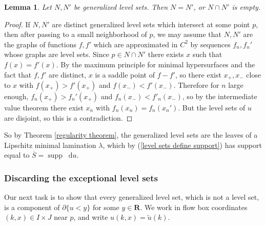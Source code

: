 \documentclass[reqno,11pt]{amsart}
\newcommand{\RR}{\mathbf{R}}
\newcommand*\dif{\mathop{}\!\mathrm{d}}
\DeclareMathOperator{\supp}{supp}
\newtheorem{lemma}[theorem]{Lemma}
\theoremstyle{definition}
\numberwithin{equation}{section}
\begin{document}


\begin{lemma}
Let $N, N'$ be generalized level sets.
Then $N = N'$, or $N \cap N'$ is empty.
\end{lemma}
\begin{proof}
If $N, N'$ are distinct generalized level sets which intersect at some point $p$, then after passing to a small neighborhood of $p$, we may assume that $N, N'$ are the graphs of functions $f, f'$ which are approximated in $C^2$ by sequences $f_n, f_n'$ whose graphs are level sets.
Since $p \in N \cap N'$ there exists $x$ such that $f(x) = f'(x)$.
By the maximum principle for minimal hypersurfaces and the fact that $f, f'$ are distinct, $x$ is a saddle point of $f - f'$, so there exist $x_+, x_-$ close to $x$ with $f(x_+) > f'(x_+)$ and $f(x_-) < f'(x_-)$.
Therefore for $n$ large enough, $f_n(x_+) > f_n'(x_+)$ and $f_n(x_-) < f'_n(x_-)$, so by the intermediate value theorem there exist $x_n$ with $f_n(x_n) = f_n(x_n')$.
But the level sets of $u$ are disjoint, so this is a contradiction.
\end{proof}

So by Theorem \ref{regularity theorem}, the generalized level sets are the leaves of a Lipschitz minimal lamination $\lambda$, which by (\ref{level sets define support}) has support equal to $\overline S = \supp \dif u$.

\subsubsection{Discarding the exceptional level sets}
Our next task is to show that every generalized level set, which is not a level set, is a component of $\partial \{u < y\}$ for some $y \in \RR$.
We work in flow box coordinates $(k, x) \in I \times J$ near $p$, and write $u(k, x) = \tilde u(k)$.
\end{document}
